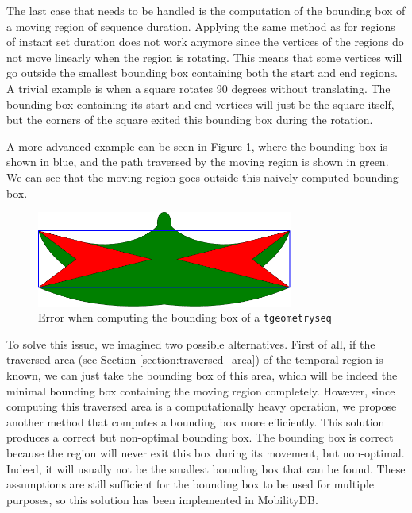 The last case that needs to be handled is the computation of the bounding box of a moving region of sequence duration. Applying the same method as for regions of instant set duration does not work anymore since the vertices of the regions do not move linearly when the region is rotating. This means that some vertices will go outside the smallest bounding box containing both the start and end regions. A trivial example is when a square rotates 90 degrees without translating. The bounding box containing its start and end vertices will just be the square itself, but the corners of the square exited this bounding box during the rotation. 

A more advanced example can be seen in Figure \ref{fig:naive_bbox_error}, where the bounding box is shown in blue, and the path traversed by the moving region is shown in green. We can see that the moving region goes outside this naively computed bounding box.

\begin{figure}[h!]
    \centering
    \includegraphics[width=0.75\textwidth]{images/naive_bbox_error.pdf}
    \caption{Error when computing the bounding box of a \lstinline+tgeometryseq+}
    \label{fig:naive_bbox_error}
\end{figure}

To solve this issue, we imagined two possible alternatives. First of all, if the traversed area (see Section \ref{section:traversed_area}) of the temporal region is known, we can just take the bounding box of this area, which will be indeed the minimal bounding box containing the moving region completely. However, since computing this traversed area is a computationally heavy operation, we propose another method that computes a bounding box more efficiently. This solution produces a correct but non-optimal bounding box. The bounding box is correct because the region will never exit this box during its movement, but non-optimal. Indeed, it will usually not be the smallest bounding box that can be found. These assumptions are still sufficient for the bounding box to be used for multiple purposes, so this solution has been implemented in MobilityDB.

